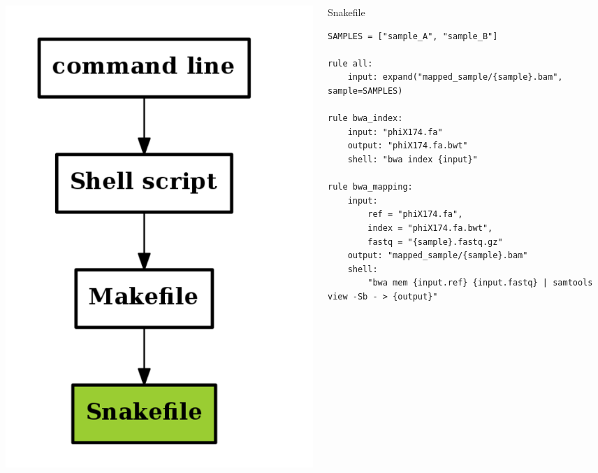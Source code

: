 \documentclass{beamer}
\begin{document}
\begin{frame}[fragile]
    \begin{columns}
 \begin{column}[T]{3cm}
 \includegraphics[width=1\textwidth, height=0.6\textheight]{images/flow_methods_4.png}
 \end{column}
  \begin{column}[T]{9cm}  
    \begin{block}{Snakefile}
    \begin{lstlisting}
SAMPLES = ["sample_A", "sample_B"]

rule all:
    input: expand("mapped_sample/{sample}.bam", sample=SAMPLES)

rule bwa_index:
    input: "phiX174.fa"
    output: "phiX174.fa.bwt"
    shell: "bwa index {input}"

rule bwa_mapping:
    input:
        ref = "phiX174.fa",
        index = "phiX174.fa.bwt",
        fastq = "{sample}.fastq.gz"
    output: "mapped_sample/{sample}.bam"
    shell:
        "bwa mem {input.ref} {input.fastq} | samtools view -Sb - > {output}"
    \end{lstlisting}
    \end{block}
    \end{column}
    \end{columns}
\end{frame}
\end{document}
